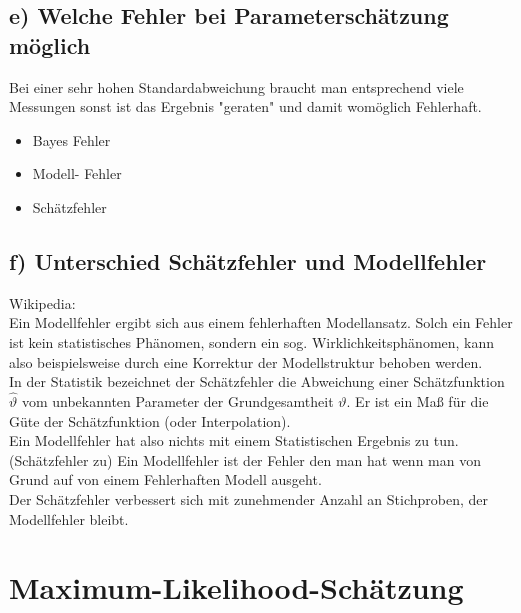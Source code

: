 \documentclass{scrartcl}
\begin{document}
\subsection*{e) Welche Fehler bei Parameterschätzung möglich}
Bei einer sehr hohen Standardabweichung braucht man entsprechend viele Messungen sonst ist das Ergebnis "geraten" und damit womöglich Fehlerhaft.\\
\begin{itemize}
	\item Bayes Fehler
	\item Modell- Fehler
	\item Schätzfehler
\end{itemize}
\subsection*{f) Unterschied Schätzfehler und Modellfehler}
Wikipedia: \\
Ein Modellfehler ergibt sich aus einem fehlerhaften Modellansatz. Solch ein Fehler ist kein statistisches Phänomen, sondern ein sog. Wirklichkeitsphänomen, kann also beispielsweise durch eine Korrektur der Modellstruktur behoben werden. \\
In der Statistik bezeichnet der Schätzfehler die Abweichung einer Schätzfunktion $\hat{\vartheta}$ vom unbekannten Parameter der Grundgesamtheit $\vartheta$. Er ist ein Maß für die Güte der Schätzfunktion (oder Interpolation). \\

Ein Modellfehler hat also nichts mit einem Statistischen Ergebnis zu tun.(Schätzfehler zu) Ein Modellfehler ist der Fehler den man hat wenn man von Grund auf von einem Fehlerhaften Modell ausgeht. \\

Der Schätzfehler verbessert sich mit zunehmender Anzahl an Stichproben, der Modellfehler bleibt.

\section{Maximum-Likelihood-Schätzung}
\end{document}
